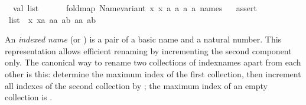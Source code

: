 \begin{isabellebody}
\isanewline
\ \ val\ list{}\ {}\isanewline
\ \ \ \ {}{}\ {}fold{}map\ Name{}variant\ {}{}x{}{}\ {}x{}{}\ {}a{}{}\ {}a{}{}\ {}{}a{}{}\ {}{}a{}{}\ names{}{}\isanewline
\ \ %
\isaantiq
assert{}%
\endisaantiq
\ {}list{}\ {}\ {}{}x{}{}\ {}xa{}{}\ {}aa{}{}\ {}ab{}{}\ {}{}aa{}{}\ {}{}ab{}{}{}{}\isanewline
{}%
\endisatagML
{\isafoldML}%
%
\isadelimML
\isanewline
%
\endisadelimML
\isanewline
{}\isamarkupfalse%
%
\isamarkuptrue%
%
\begin{isamarkuptext}%
An \emph{indexed name} (or ) is a pair of a basic
  name and a natural number.  This representation allows efficient
  renaming by incrementing the second component only.  The canonical
  way to rename two collections of indexnames apart from each other is
  this: determine the maximum index  of the first
  collection, then increment all indexes of the second collection by
  ; the maximum index of an empty collection is
  .


\end{isamarkuptext}
\end{isabellebody}
